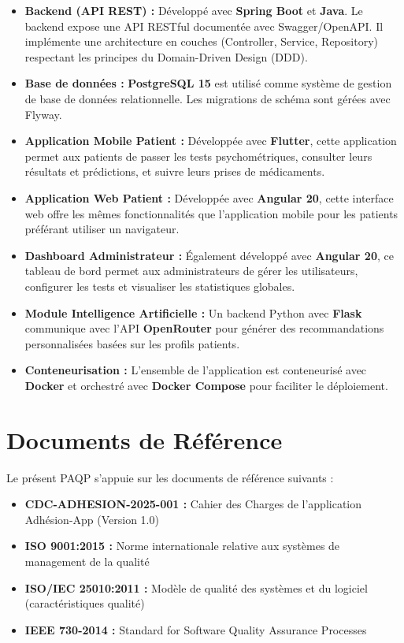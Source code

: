\documentclass[12pt,a4paper]{report}
\begin{document}
\begin{itemize}
    \item \textbf{Backend (API REST) :} Développé avec \textbf{Spring Boot} et \textbf{Java}. Le backend expose une API RESTful documentée avec Swagger/OpenAPI. Il implémente une architecture en couches (Controller, Service, Repository) respectant les principes du Domain-Driven Design (DDD).
    
    \item \textbf{Base de données :} \textbf{PostgreSQL 15} est utilisé comme système de gestion de base de données relationnelle. Les migrations de schéma sont gérées avec Flyway.
    
    \item \textbf{Application Mobile Patient :} Développée avec \textbf{Flutter}, cette application permet aux patients de passer les tests psychométriques, consulter leurs résultats et prédictions, et suivre leurs prises de médicaments.
    
    \item \textbf{Application Web Patient :} Développée avec \textbf{Angular 20}, cette interface web offre les mêmes fonctionnalités que l'application mobile pour les patients préférant utiliser un navigateur.
    
    \item \textbf{Dashboard Administrateur :} Également développé avec \textbf{Angular 20}, ce tableau de bord permet aux administrateurs de gérer les utilisateurs, configurer les tests et visualiser les statistiques globales.
    
    \item \textbf{Module Intelligence Artificielle :} Un backend Python avec \textbf{Flask} communique avec l'API \textbf{OpenRouter} pour générer des recommandations personnalisées basées sur les profils patients.
    
    \item \textbf{Conteneurisation :} L'ensemble de l'application est conteneurisé avec \textbf{Docker} et orchestré avec \textbf{Docker Compose} pour faciliter le déploiement.
\end{itemize}

\section{Documents de Référence}

Le présent PAQP s'appuie sur les documents de référence suivants :

\begin{itemize}
    \item \textbf{CDC-ADHESION-2025-001 :} Cahier des Charges de l'application Adhésion-App (Version 1.0)
    \item \textbf{ISO 9001:2015 :} Norme internationale relative aux systèmes de management de la qualité
    \item \textbf{ISO/IEC 25010:2011 :} Modèle de qualité des systèmes et du logiciel (caractéristiques qualité)
    \item \textbf{IEEE 730-2014 :} Standard for Software Quality Assurance Processes
\end{itemize}
\end{document}
